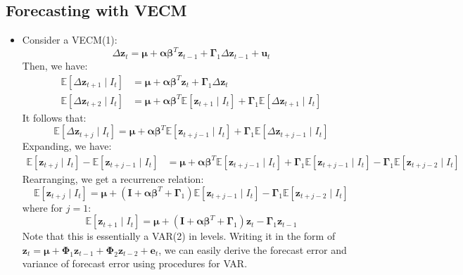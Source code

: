 \documentclass[notitlepage]{article}
\begin{document}
\subsection{Forecasting with VECM}

\begin{itemize}
    \item Consider a VECM(1):
    \[
    \Delta \mathbf{z}_t = \boldsymbol\mu + \boldsymbol{\alpha}\boldsymbol{\beta}^T\mathbf{z}_{t-1} + \boldsymbol{\Gamma}_1 \Delta \mathbf{z}_{t-1} + \mathbf{u}_t %
    \]
    Then, we have:
    \begin{align*}
        \mathbb{E}[\Delta \mathbf{z}_{t+1} \mid I_t] &= \boldsymbol\mu + \boldsymbol{\alpha} \boldsymbol{\beta}^T\mathbf{z}_{t} + \boldsymbol{\Gamma}_1 \Delta \mathbf{z}_{t} \\%
        \mathbb{E}[\Delta \mathbf{z}_{t+2} \mid I_t] &= \boldsymbol\mu + \boldsymbol{\alpha} \boldsymbol{\beta}^T\mathbb{E}[\mathbf{z}_{t+1} \mid I_t] + \boldsymbol{\Gamma}_1 \mathbb{E}[\Delta \mathbf{z}_{t+1} \mid I_t]%
    \end{align*}
    It follows that:
    \[
    \mathbb{E}[\Delta \mathbf{z}_{t+j} \mid I_t] = \boldsymbol\mu + \boldsymbol{\alpha} \boldsymbol{\beta}^T\mathbb{E}[\mathbf{z}_{t+j-1} \mid I_t] + \boldsymbol{\Gamma}_1 \mathbb{E}[\Delta \mathbf{z}_{t+j-1} \mid I_t] %
    \]
    Expanding, we have:
    \begin{align*}
    \mathbb{E}[\mathbf{z}_{t+j} \mid I_t] - \mathbb{E}[\mathbf{z}_{t+j-1} \mid I_t] &= \boldsymbol\mu + \boldsymbol{\alpha} \boldsymbol{\beta}^T\mathbb{E}[\mathbf{z}_{t+j-1} \mid I_t] + \boldsymbol{\Gamma}_1 \mathbb{E}[\mathbf{z}_{t+j-1} \mid I_t] - \boldsymbol{\Gamma}_1 \mathbb{E}[\mathbf{z}_{t+j-2} \mid I_t]%
    \end{align*}
    Rearranging, we get a recurrence relation:
    \[
    \mathbb{E}[\mathbf{z}_{t+j} \mid I_t] = \boldsymbol\mu + (\mathbf{I} + \boldsymbol{\alpha} \boldsymbol{\beta}^T + \boldsymbol{\Gamma}_1) \mathbb{E}[\mathbf{z}_{t+j-1} \mid I_t] - \boldsymbol{\Gamma}_1 \mathbb{E}[\mathbf{z}_{t+j-2} \mid I_t] %
    \]
    where for \(j=1\):
    \[
    \mathbb{E}[\mathbf{z}_{t+1} \mid I_t] = \boldsymbol\mu + (\mathbf{I} + \boldsymbol{\alpha} \boldsymbol{\beta}^T + \boldsymbol{\Gamma}_1) \mathbf{z}_{t} - \boldsymbol{\Gamma}_1\mathbf{z}_{t-1}
    \]
    Note that this is essentially a VAR(2) in levels. Writing it in the form of \(\mathbf{z}_{t} = \boldsymbol{\mu} + \boldsymbol{\Phi}_1 \mathbf{z}_{t-1} + \boldsymbol{\Phi}_2 \mathbf{z}_{t-2} + \mathbf{e}_t\), we can easily derive the forecast error and variance of forecast error using procedures for VAR.
\end{itemize}
\end{document}
